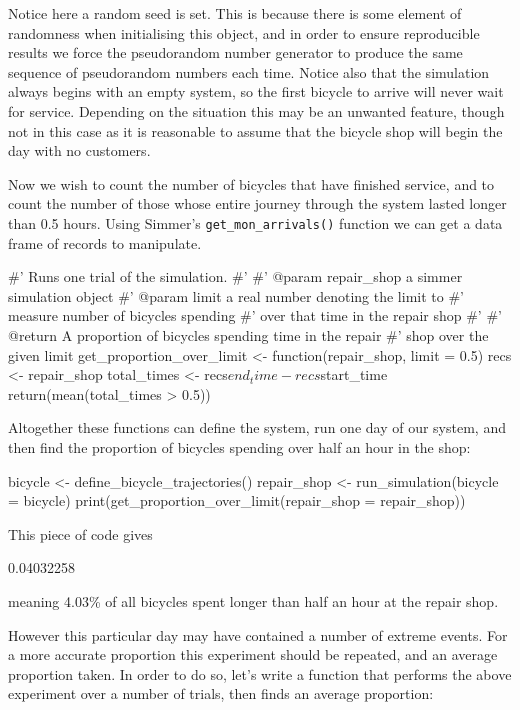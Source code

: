 Notice here a random seed is set. This is because there is some element of
randomness when initialising this object, and in order to ensure reproducible
results we force the pseudorandom number generator to produce the same sequence
of pseudorandom numbers each time.
Notice also that the simulation always begins with an empty system, so the first
bicycle to arrive will never wait for service. Depending on the situation this
may be an unwanted feature, though not in this case as it is reasonable to
assume that the bicycle shop will begin the day with no customers.

Now we wish to count the number of bicycles that have finished service, and to
count the number of those whose entire journey through the system lasted longer
than 0.5 hours. Using Simmer's \texttt{get_mon_arrivals()} function we
can get a data frame of records to manipulate.

\begin{Rin}
#' Runs one trial of the simulation.
#'
#' @param repair_shop a simmer simulation object
#' @param limit a real number denoting the limit to
#'              measure number of bicycles spending
#'              over that time in the repair shop
#'
#' @return A proportion of bicycles spending time in the repair
#'         shop over the given limit
get_proportion_over_limit <- function(repair_shop, limit = 0.5) {
  recs <- repair_shop %
  total_times <- recs$end_time - recs$start_time
  return(mean(total_times > 0.5))
}
\end{Rin}

Altogether these functions can define the system, run one day of our system, and
then find the proportion of bicycles spending over half an hour in the shop:

\begin{Rin}
bicycle <- define_bicycle_trajectories()
repair_shop <- run_simulation(bicycle = bicycle)
print(get_proportion_over_limit(repair_shop = repair_shop))
\end{Rin}

This piece of code gives

\begin{Rout}
[1] 0.04032258
\end{Rout}

meaning 4.03\% of all bicycles spent longer than half an hour at the repair
shop.

However this particular day may have contained a number of extreme events.
For a more accurate proportion this experiment should be repeated, and an
average proportion taken.
In order to do so, let's write a function that performs the above experiment
over a number of trials, then finds an average proportion:

